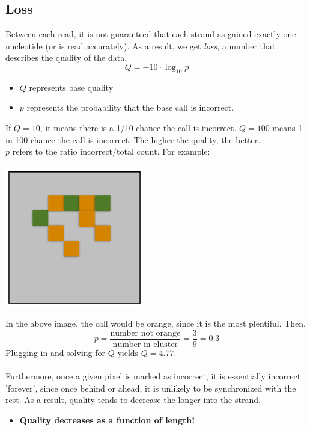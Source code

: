 \documentclass[10pt]{article}
\begin{document}
\subsection*{Loss}
Between each read, it is not guaranteed that each strand as gained exactly one nucleotide (or is read accurately).  As a result, we get \textit{loss}, a number that describes the quality of the data.
\[Q = -10 \cdot \log_{10} p\]
\begin{itemize}
    \item $Q$ represents base quality
    \item $p$ represents the probability that the base call is incorrect.
\end{itemize}
If $Q = 10$, it means there is a 1/10 chance the call is incorrect.  $Q=100$ means 1 in 100 chance the call is incorrect.  The higher the quality, the better.\\
$p$ refers to the ratio $\text{incorrect} / \text{total count}$.  For example:
\begin{center}
    \includegraphics*[scale=0.5]{W1_2.png}
\end{center}
In the above image, the call would be orange, since it is the most plentiful.  Then,
\[p = \frac{\text{number not orange}}{\text{number in cluster}} = \frac{3}{9} = 0.\bar 3\]
Plugging in and solving for $Q$ yields $Q = 4.77$.\\\\
Furthermore, once a given pixel is marked as incorrect, it is essentially incorrect 'forever', since once behind or ahead, it is unlikely to be synchronized with the rest.  As a result, quality tends to decrease the longer into the strand.
\begin{itemize}
    \item \textbf{Quality decreases as a function of length!}
\end{itemize}
\end{document}

